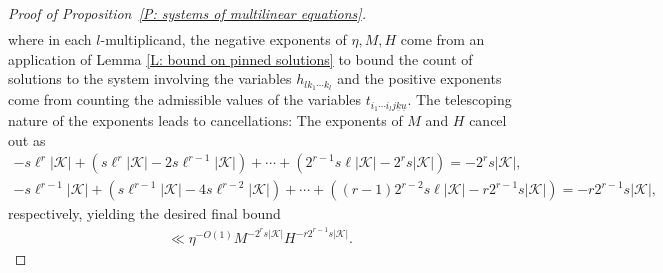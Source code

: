 \documentclass[10pt,a4paper]{amsart}
\newcommand{\CK}{{\mathcal K}}
\newcommand{\uk}{{\underline{k}}}
\newcommand{\uu}{{\underline{u}}}
\begin{document}
\begin{proof}[Proof of Proposition~\ref{P: systems of multilinear equations}]
\begin{align*}
    \end{align*}
    where in each $l$-multiplicand, the negative exponents of $\eta, M, H$ come from an application of Lemma \ref{L: bound on pinned solutions} to bound the count of solutions to the system involving the variables $h_{lk_1\cdots k_l}$ and the positive exponents come from counting the admissible values of the variables $t_{i_1\cdots i_l j\uk\uu}$. The telescoping nature of the exponents leads to cancellations: The exponents of $M$ and $H$ cancel out as
    \begin{gather*}
        -s\ell^r|\CK| + (s\ell^r|\CK| - 2s\ell^{r-1}|\CK|) + \cdots + (2^{r-1}s\ell|\CK| - 2^r s|\CK|) = -2^r s|\CK|,\\
        -s\ell^{r-1}|\CK| + (s\ell^{r-1}|\CK| - 4s\ell^{r-2}|\CK|) + \cdots + ((r-1)2^{r-2}s\ell|\CK| - r2^{r-1}s|\CK|) = -r2^{r-1}s|\CK|,
    \end{gather*}
    respectively, yielding the desired final bound
    \begin{align*}
        \ll\eta^{-O(1)} M^{-2^r s|\CK|} H^{-r2^{r-1}s|\CK|}.
    \end{align*} 
    \end{proof}
\end{document}
